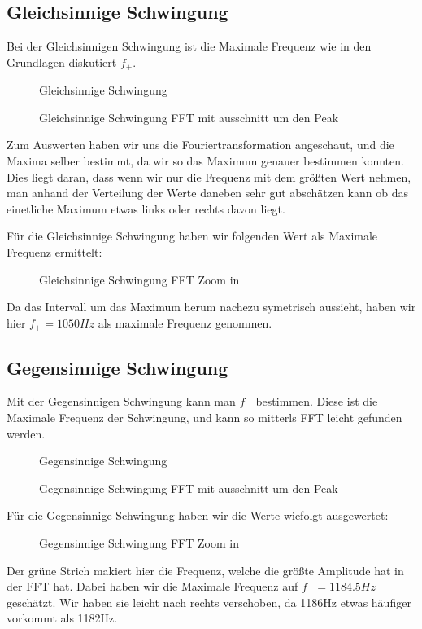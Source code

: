 \documentclass[twoside]{protokoll}
\begin{document}
\subsection{Gleichsinnige Schwingung}
Bei der Gleichsinnigen Schwingung ist die Maximale Frequenz wie in den Grundlagen diskutiert $f_+$.
\begin{figure}[H]
    \centering
    \caption{Gleichsinnige Schwingung}
\end{figure}
\begin{figure}[H]
    \centering
    \caption{Gleichsinnige Schwingung FFT mit ausschnitt um den Peak}
\end{figure}
Zum Auswerten haben wir uns die Fouriertransformation angeschaut, und die Maxima selber bestimmt, da wir so das Maximum genauer bestimmen konnten.
Dies liegt daran, dass wenn wir nur die Frequenz mit dem größten Wert nehmen, man anhand der Verteilung der Werte daneben sehr gut abschätzen kann ob das einetliche Maximum etwas links oder rechts davon liegt.

Für die Gleichsinnige Schwingung haben wir folgenden Wert als Maximale Frequenz ermittelt:
\begin{figure}[H]
    \centering
    \caption{Gleichsinnige Schwingung FFT Zoom in}
\end{figure}
Da das Intervall um das Maximum herum nachezu symetrisch aussieht, haben wir hier $f_+=1050Hz$ als maximale Frequenz genommen.

 
\subsection{Gegensinnige Schwingung}
Mit der Gegensinnigen Schwingung kann man $f_-$ bestimmen. Diese ist die Maximale Frequenz der Schwingung, und kann so mitterls FFT leicht gefunden werden.
\begin{figure}[H]
    \centering
    \caption{Gegensinnige Schwingung}
\end{figure}
\begin{figure}[H]
    \centering
    \caption{Gegensinnige Schwingung FFT mit ausschnitt um den Peak}
\end{figure}
Für die Gegensinnige Schwingung haben wir die Werte wiefolgt ausgewertet:
\begin{figure}[H]
    \centering
    \caption{Gegensinnige Schwingung FFT Zoom in}
\end{figure}
Der grüne Strich makiert hier die Frequenz, welche die größte Amplitude hat in der FFT hat.
Dabei haben wir die Maximale Frequenz auf $f_-=1184.5Hz$ geschätzt.
Wir haben sie leicht nach rechts verschoben, da 1186Hz etwas häufiger vorkommt als 1182Hz.
\end{document}
